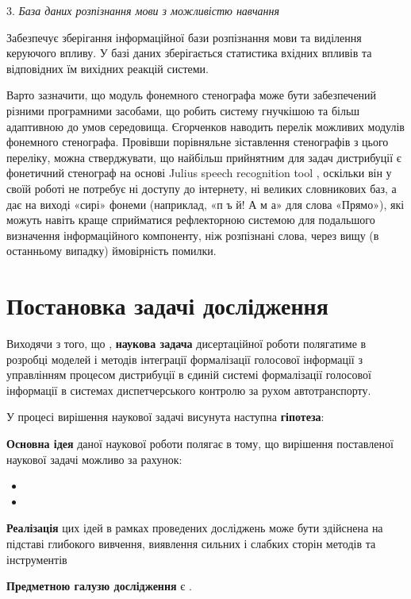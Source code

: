 3. \textit{База даних розпізнання мови з можливістю навчання}

Забезпечує зберігання інформаційної бази розпізнання мови та виділення керуючого впливу. У базі даних зберігається статистика вхідних впливів та відповідних їм вихідних реакцій системи.

Варто зазначити, що модуль фонемного стенографа може бути забезпечений різними програмними засобами, що робить систему гнучкішою та більш адаптивною до умов середовища. Єгорченков \cite{Egorchenkov_2016} наводить перелік можливих модулів фонемного стенографа. Провівши порівняльне зіставлення стенографів з цього переліку, можна стверджувати, що найбільш прийнятним для задач дистрибуції є фонетичний стенограф на основі Julius speech recognition tool \cite{Pylypenko_2009}, оскільки він у своїй роботі не потребує ні доступу до інтернету, ні великих словникових баз, а дає на виході «сирі» фонеми (наприклад, «п ъ й! А м а» для слова «Прямо»), які можуть навіть краще сприйматися рефлекторною системою для подальшого визначення інформаційного компоненту, ніж розпізнані слова, через вищу (в останньому випадку) ймовірність помилки.

\section{Постановка задачі дослідження} \label{sect1_6}

Виходячи з того, що , \textbf{наукова задача} дисертаційної роботи полягатиме в розробці моделей і методів інтеграції формалізації голосової інформації з управлінням процесом дистрибуції в єдиній системі формалізації голосової інформації в системах диспетчерського контролю за рухом автотранспорту.

У процесі вирішення наукової задачі висунута наступна \textbf{гіпотеза}: 

\textbf{Основна ідея} даної наукової роботи полягає в тому, що вирішення поставленої наукової задачі можливо за рахунок:

\begin{itemize}
	\item {}
	\item {}
\end{itemize}

\textbf{Реалізація} цих ідей в рамках проведених досліджень може бути здійснена на підставі глибокого вивчення, виявлення сильних і слабких сторін методів та інструментів 

\textbf{Предметною галузю дослідження} є .

